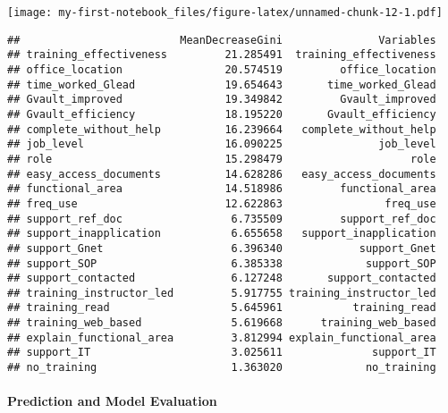 \documentclass[
]{article}
\newenvironment{Shaded}{\begin{snugshade}}{\end{snugshade}}
\newcommand{\CommentTok}[1]{\textcolor[rgb]{0.56,0.35,0.01}{\textit{#1}}}
\newcommand{\DataTypeTok}[1]{\textcolor[rgb]{0.13,0.29,0.53}{#1}}
\newcommand{\DecValTok}[1]{\textcolor[rgb]{0.00,0.00,0.81}{#1}}
\newcommand{\KeywordTok}[1]{\textcolor[rgb]{0.13,0.29,0.53}{\textbf{#1}}}
\newcommand{\NormalTok}[1]{#1}
\newcommand{\OperatorTok}[1]{\textcolor[rgb]{0.81,0.36,0.00}{\textbf{#1}}}
\newcommand{\StringTok}[1]{\textcolor[rgb]{0.31,0.60,0.02}{#1}}
\begin{document}
\texttt{[image: my-first-notebook\_files/figure-latex/unnamed-chunk-12-1.pdf]}

\begin{Shaded}
\end{Shaded}

\begin{verbatim}
##                         MeanDecreaseGini               Variables
## training_effectiveness         21.285491  training_effectiveness
## office_location                20.574519         office_location
## time_worked_Glead              19.654643       time_worked_Glead
## Gvault_improved                19.349842         Gvault_improved
## Gvault_efficiency              18.195220       Gvault_efficiency
## complete_without_help          16.239664   complete_without_help
## job_level                      16.090225               job_level
## role                           15.298479                    role
## easy_access_documents          14.628286   easy_access_documents
## functional_area                14.518986         functional_area
## freq_use                       12.622863                freq_use
## support_ref_doc                 6.735509         support_ref_doc
## support_inapplication           6.655658   support_inapplication
## support_Gnet                    6.396340            support_Gnet
## support_SOP                     6.385338             support_SOP
## support_contacted               6.127248       support_contacted
## training_instructor_led         5.917755 training_instructor_led
## training_read                   5.645961           training_read
## training_web_based              5.619668      training_web_based
## explain_functional_area         3.812994 explain_functional_area
## support_IT                      3.025611              support_IT
## no_training                     1.363020             no_training
\end{verbatim}

\hypertarget{prediction-and-model-evaluation}{%
\paragraph{Prediction and Model
Evaluation}\label{prediction-and-model-evaluation}}
\end{document}
